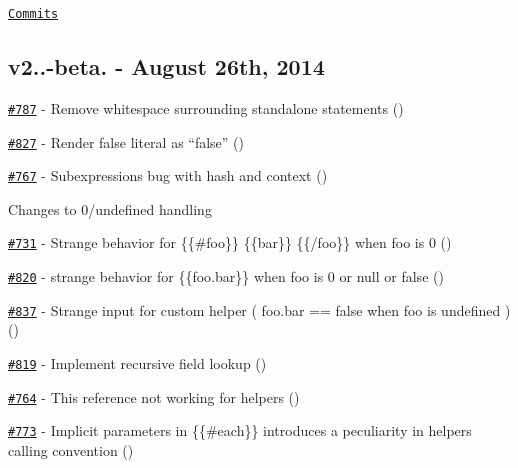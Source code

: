 \href{https://github.com/wycats/handlebars.js/compare/v2.0.0-beta.1...v2.0.0}{\tt Commits}

\subsection*{v2..-\/beta. -\/ August 26th, 2014}


\begin{DoxyItemize}
\item \href{https://github.com/wycats/handlebars.js/pull/787}{\tt \#787} -\/ Remove whitespace surrounding standalone statements (\href{https://api.github.com/users/kpdecker}{\tt })
\item \href{https://github.com/wycats/handlebars.js/issues/827}{\tt \#827} -\/ Render false literal as “false” (\href{https://api.github.com/users/scoot557}{\tt })
\item \href{https://github.com/wycats/handlebars.js/issues/767}{\tt \#767} -\/ Subexpressions bug with hash and context (\href{https://api.github.com/users/evensoul}{\tt })
\item Changes to 0/undefined handling
\begin{DoxyItemize}
\item \href{https://github.com/wycats/handlebars.js/pull/731}{\tt \#731} -\/ Strange behavior for \{\{\#foo\}\} \{\{bar\}\} \{\{/foo\}\} when foo is 0 (\href{https://api.github.com/users/kpdecker}{\tt })
\item \href{https://github.com/wycats/handlebars.js/issues/820}{\tt \#820} -\/ strange behavior for \{\{foo.\+bar\}\} when foo is 0 or null or false (\href{https://api.github.com/users/zordius}{\tt })
\item \href{https://github.com/wycats/handlebars.js/issues/837}{\tt \#837} -\/ Strange input for custom helper ( foo.\+bar == false when foo is undefined ) (\href{https://api.github.com/users/zordius}{\tt })
\end{DoxyItemize}
\item \href{https://github.com/wycats/handlebars.js/pull/819}{\tt \#819} -\/ Implement recursive field lookup (\href{https://api.github.com/users/kpdecker}{\tt })
\item \href{https://github.com/wycats/handlebars.js/issues/764}{\tt \#764} -\/ This reference not working for helpers (\href{https://api.github.com/users/kpdecker}{\tt })
\item \href{https://github.com/wycats/handlebars.js/issues/773}{\tt \#773} -\/ Implicit parameters in \{\{\#each\}\} introduces a peculiarity in helpers calling convention (\href{https://api.github.com/users/Bertrand}{\tt })

\end{DoxyItemize}
